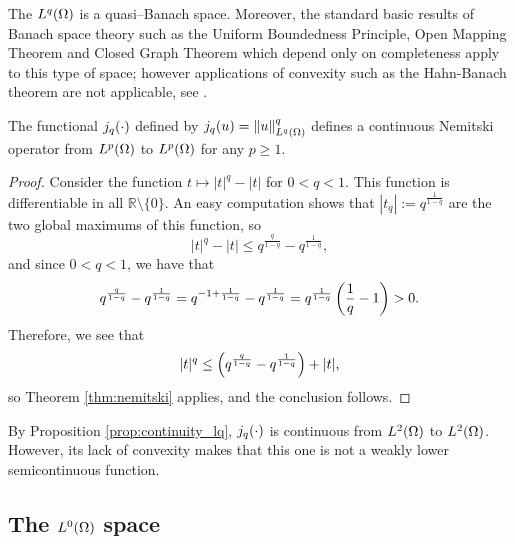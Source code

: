 \begin{remark}
	The $L^q(\Omega)$ is a quasi--Banach space. Moreover, the standard basic results of Banach space theory such as the 
	Uniform Boundedness Principle, Open Mapping Theorem and Closed Graph 
	Theorem which depend only on completeness apply to this type of space; 
	however applications of convexity such as the Hahn-Banach theorem are not applicable, see \cite[Chapter 25]{geometry_banach_spaces}.
\end{remark}

\begin{proposition}\label{prop:continuity_lq}
The functional $j_q(\cdot)$ defined by $j_q(u)=\lVert u \rVert_{L^q(\Omega)}^q$ defines a continuous 
Nemitski operator from $L^p(\Omega)$ to $L^p(\Omega)$ for any $p\ge 1$.
\end{proposition}

\begin{proof}
	Consider the function $t\mapsto |t|^q-|t|$ for $0<q<1$. This function is differentiable
	in all $\mathbb{R}\setminus \{0\}$. An easy computation shows that $|t_q|:=q^{\frac{1}{1-q}}$
	are the two global maximums of this function, so
	\[
	|t|^q-|t|\le q^{\frac{q}{1-q}}-q^{\frac{1}{1-q}},
	\]
	and since $0<q<1$, we have that 
	$$q^{\frac{q}{1-q}}-q^{\frac{1}{1-q}}=q^{-1+\frac{1}{1-q}}-q^{\frac{1}{1-q}}=q^{\frac{1}{1-q}}\left(\frac{1}{q}-1\right)>0.$$
	Therefore, we see that 
	$$ |t|^q\le \left( q^{\frac{q}{1-q}}-q^{\frac{1}{1-q}}\right)+|t|,$$
	so Theorem \ref{thm:nemitski} applies, and the conclusion follows.
\end{proof}

By Proposition \ref{prop:continuity_lq}, $j_q(\cdot)$
is continuous from $L^2(\Omega)$ to $L^2(\Omega)$. However, its lack of convexity makes
that this one is not a weakly lower semicontinuous function.

\subsection{The $L^0(\Omega)$ space}\label{subsec:l0_space}

